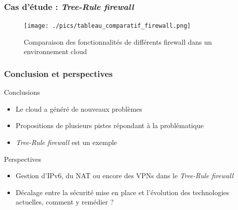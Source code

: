 \documentclass{beamer}
\begin{document}


\begin{frame}
\frametitle{Cas d'étude : \textit{Tree-Rule firewall}}
\begin{figure}
	\centering
	\captionsetup{justification=centering}
	\texttt{[image: ./pics/tableau\_comparatif\_firewall.png]}
	\caption{Comparaison des fonctionnalités de différents firewall dans un environnement cloud}
	\label{figure4}
\end{figure}
\end{frame}



\begin{frame}
\frametitle{Conclusion et perspectives}
\begin{block}{Conclusions}
	\begin{itemize}
		\item Le cloud a généré de nouveaux problèmes
		\item Propositions de plusieurs pistes répondant à la problématique
		\item \textit{Tree-Rule firewall} est un exemple
	\end{itemize}
\end{block}
\vfill
\begin{block}{Perspectives}
	\begin{itemize}
		\item Gestion d'IPv6, du NAT ou encore des VPNs dans le \textit{Tree-Rule firewall}
		\item Décalage entre la sécurité mise en place et l'évolution des technologies actuelles, comment y remédier ?
	\end{itemize}
\end{block}
\end{frame}


\end{document}
